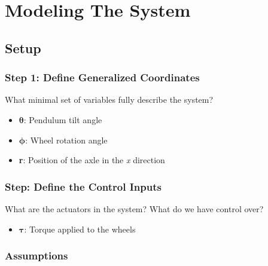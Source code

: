 \chapter{Modeling The System}

\section{Setup}

\subsection{Step 1: Define Generalized Coordinates}

What minimal set of variables fully describe the system?

\begin{itemize}
	\item $\boldsymbol{\theta}$: Pendulum tilt angle
	\item $\boldsymbol{\phi}$: Wheel rotation angle
	\item \textbf{r}: Position of the axle in the \textit{x} direction
\end{itemize}

\subsection{Step: Define the Control Inputs}

What are the actuators in the system? What do we have control over?

\begin{itemize}
	\item $\boldsymbol{\tau}$: Torque applied to the wheels
\end{itemize}

\subsection{Assumptions}

